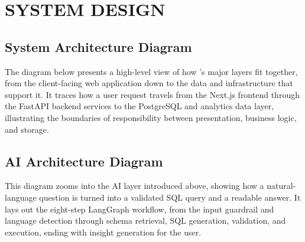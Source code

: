 \clearpage
\section{SYSTEM DESIGN}
\label{sec:system-design}

\subsection{System Architecture Diagram}
\label{sub:system-architecture}

The diagram below presents a high-level view of how \projname{}'s major
layers fit together, from the client-facing web application down to the
data and infrastructure that support it. It traces how a user request
travels from the Next.js frontend through the FastAPI backend services
to the PostgreSQL and analytics data layer, illustrating the boundaries
of responsibility between presentation, business logic, and storage.


\clearpage
\subsection{AI Architecture Diagram}
\label{sub:ai-architecture}

This diagram zooms into the AI layer introduced above, showing how a
natural-language question is turned into a validated SQL query and a
readable answer. It lays out the eight-step LangGraph workflow, from
the input guardrail and language detection through schema retrieval,
SQL generation, validation, and execution, ending with insight
generation for the user.


